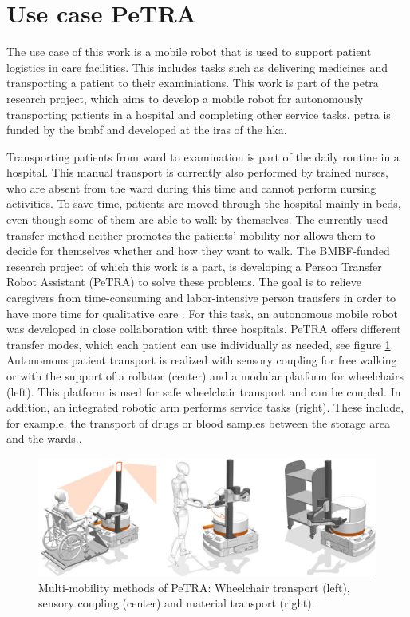 \section{Use case PeTRA}
\label{sec:use_case}
The use case of this work is a mobile robot that is used to support patient logistics in care facilities. This includes tasks such as delivering medicines and transporting a patient to their examiniations. This work is part of the \gls{petra} research project, which aims to develop a mobile robot for autonomously transporting patients in a hospital and completing other service tasks. \gls{petra} is funded by the \gls{bmbf} and developed at the \gls{iras} of the \gls{hka}.

Transporting patients from ward to examination is part of the daily routine in a hospital. This manual transport is currently also performed by trained nurses, who are absent from the ward during this time and cannot perform nursing activities. To save time, patients are moved through the hospital mainly in beds, even though some of them are able to walk by themselves. The currently used transfer method neither promotes the patients' mobility nor allows them to decide for themselves whether and how they want to walk. The BMBF-funded research project of which this work is a part, is developing a Person Transfer Robot Assistant (PeTRA) to solve these problems. The goal is to relieve caregivers from time-consuming and labor-intensive person transfers in order to have more time for qualitative care \cite{petra-konsortium_personen-transfer_2022}. For this task, an autonomous mobile robot was developed in close collaboration with three hospitals. PeTRA offers different transfer modes, which each patient can use individually as needed, see figure  \ref{fig:multi_mobility_methods}. Autonomous patient transport is realized with sensory coupling for free walking or with the support of a rollator (center) and a modular platform for wheelchairs (left). This platform is used for safe wheelchair transport and can be coupled. In addition, an integrated robotic arm performs service tasks (right). These include, for example, the transport of drugs or blood samples between the storage area and the wards..

\begin{figure}[h]
\includegraphics[width=\textwidth]{figures/02_state_of_the_art/PeTRA_transport_modes.jpg}
\caption[]{Multi-mobility methods of PeTRA: Wheelchair transport (left), sensory coupling (center) and material transport (right).}
\centering
\label{fig:multi_mobility_methods}
\end{figure}


